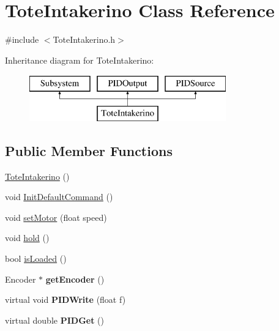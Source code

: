 \hypertarget{class_tote_intakerino}{}\section{Tote\+Intakerino Class Reference}
\label{class_tote_intakerino}


{\ttfamily \#include $<$Tote\+Intakerino.\+h$>$}

Inheritance diagram for Tote\+Intakerino\+:\begin{figure}[H]
\begin{center}
\leavevmode
\includegraphics[height=2.000000cm]{class_tote_intakerino}
\end{center}
\end{figure}
\subsection*{Public Member Functions}
\begin{DoxyCompactItemize}
\item 
\hyperlink{class_tote_intakerino_a754194267a81d64543ca83d0ca0b6846}{Tote\+Intakerino} ()
\item 
void \hyperlink{class_tote_intakerino_a57cd7612442d6a91f12e4e736f6f9715}{Init\+Default\+Command} ()
\item 
void \hyperlink{class_tote_intakerino_a638941b4ab78e4012e7e2c3061e121e0}{set\+Motor} (float speed)
\item 
void \hyperlink{class_tote_intakerino_a2edb12308d1b27cb5a07e7bd01c1a889}{hold} ()
\item 
bool \hyperlink{class_tote_intakerino_a8c225c0792fddce3e79f07a0faad1318}{is\+Loaded} ()
\item 
\hypertarget{class_tote_intakerino_aaed3645ed0174f77bc542e5650019411}{}Encoder $\ast$ {\bfseries get\+Encoder} ()\label{class_tote_intakerino_aaed3645ed0174f77bc542e5650019411}

\item 
\hypertarget{class_tote_intakerino_a746600f1fd998f1bf686c711bc7d31a5}{}virtual void {\bfseries P\+I\+D\+Write} (float f)\label{class_tote_intakerino_a746600f1fd998f1bf686c711bc7d31a5}

\item 
\hypertarget{class_tote_intakerino_a3045993c8702f1b8bd5827090da1f1ad}{}virtual double {\bfseries P\+I\+D\+Get} ()\label{class_tote_intakerino_a3045993c8702f1b8bd5827090da1f1ad}

\end{DoxyCompactItemize}


